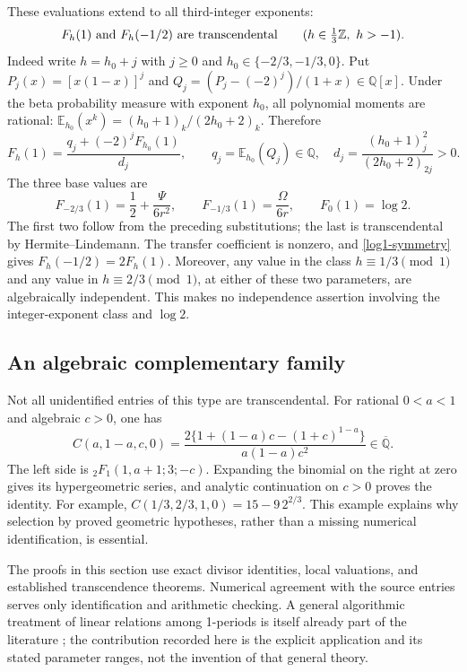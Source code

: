 \documentclass[11pt,a4paper]{article}
\theoremstyle{definition}
\theoremstyle{remark}
\numberwithin{equation}{section}
\begin{document}
These evaluations extend to all third-integer exponents:
\begin{equation}\label{log1-all-thirds}
 F_h(1)\ \hbox{and}\ F_h(-1/2)\ \hbox{are transcendental}
 \qquad(h\in\tfrac13\mathbb Z,\ h>-1).
\end{equation}
Indeed write $h=h_0+j$ with $j\ge0$ and
$h_0\in\{-2/3,-1/3,0\}$. Put $P_j(x)=[x(1-x)]^j$ and
$Q_j=(P_j-(-2)^j)/(1+x)\in\mathbb Q[x]$. Under the beta probability
measure with exponent $h_0$, all polynomial moments are rational:
$\mathbb E_{h_0}(x^k)=(h_0+1)_k/(2h_0+2)_k$. Therefore
\[
 F_h(1)=\frac{q_j+(-2)^jF_{h_0}(1)}{d_j},\qquad
 q_j=\mathbb E_{h_0}(Q_j)\in\mathbb Q,\quad
 d_j=\frac{(h_0+1)_j^2}{(2h_0+2)_{2j}}>0.
\]
The three base values are
\[
 F_{-2/3}(1)=\frac12+\frac\Psi{6r^2},\qquad
 F_{-1/3}(1)=\frac\Omega{6r},\qquad F_0(1)=\log2.
\]
The first two follow from the preceding substitutions; the last is
transcendental by Hermite--Lindemann. The transfer coefficient is
nonzero, and \eqref{log1-symmetry} gives $F_h(-1/2)=2F_h(1)$.
Moreover, any value in the class $h\equiv1/3\pmod1$ and any value in
$h\equiv2/3\pmod1$, at either of these two parameters, are
algebraically independent. This makes no independence assertion
involving the integer-exponent class and $\log2$.

\subsection{An algebraic complementary family}

Not all unidentified entries of this type are transcendental. For
rational $0<a<1$ and algebraic $c>0$, one has
\begin{equation}\label{log1-algebraic-complement}
 C(a,1-a,c,0)
 =\frac{2\{1+(1-a)c-(1+c)^{1-a}\}}{a(1-a)c^2}
 \in\overline{\mathbb Q}.
\end{equation}
The left side is ${}_2F_1(1,a+1;3;-c)$. Expanding the binomial on the
right at zero gives its hypergeometric series, and analytic
continuation on $c>0$ proves the identity. For example,
$C(1/3,2/3,1,0)=15-9\,2^{2/3}$. This example explains why selection
by proved geometric hypotheses, rather than a missing numerical
identification, is essential.

The proofs in this section use exact divisor identities, local
valuations, and established transcendence theorems. Numerical agreement
with the source entries serves only identification and arithmetic
checking. A general algorithmic treatment of linear relations among
1-periods is itself already part of the literature
\cite{log1-sertoz}; the contribution recorded here is the explicit
application and its stated parameter ranges, not the invention of that
general theory.
\end{document}
